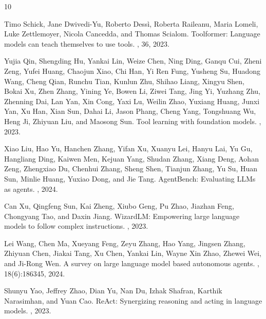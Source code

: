 \documentclass[sigconf,nonacm]{acmart}
\begin{document}

\begin{thebibliography}{10}

Timo Schick, Jane Dwivedi-Yu, Roberto Dessì, Roberta Raileanu, Maria Lomeli, Luke Zettlemoyer, Nicola Cancedda, and Thomas Scialom.
\newblock Toolformer: Language models can teach themselves to use tools.
, 36, 2023.

Yujia Qin, Shengding Hu, Yankai Lin, Weize Chen, Ning Ding, Ganqu Cui, Zheni Zeng, Yufei Huang, Chaojun Xiao, Chi Han, Yi Ren Fung, Yusheng Su, Huadong Wang, Cheng Qian, Runchu Tian, Kunlun Zhu, Shihao Liang, Xingyu Shen, Bokai Xu, Zhen Zhang, Yining Ye, Bowen Li, Ziwei Tang, Jing Yi, Yuzhang Zhu, Zhenning Dai, Lan Yan, Xin Cong, Yaxi Lu, Weilin Zhao, Yuxiang Huang, Junxi Yan, Xu Han, Xian Sun, Dahai Li, Jason Phang, Cheng Yang, Tongshuang Wu, Heng Ji, Zhiyuan Liu, and Maosong Sun.
\newblock Tool learning with foundation models.
, 2023.

Xiao Liu, Hao Yu, Hanchen Zhang, Yifan Xu, Xuanyu Lei, Hanyu Lai, Yu Gu, Hangliang Ding, Kaiwen Men, Kejuan Yang, Shudan Zhang, Xiang Deng, Aohan Zeng, Zhengxiao Du, Chenhui Zhang, Sheng Shen, Tianjun Zhang, Yu Su, Huan Sun, Minlie Huang, Yuxiao Dong, and Jie Tang.
\newblock AgentBench: Evaluating LLMs as agents.
, 2024.

Can Xu, Qingfeng Sun, Kai Zheng, Xiubo Geng, Pu Zhao, Jiazhan Feng, Chongyang Tao, and Daxin Jiang.
\newblock WizardLM: Empowering large language models to follow complex instructions.
, 2023.

Lei Wang, Chen Ma, Xueyang Feng, Zeyu Zhang, Hao Yang, Jingsen Zhang, Zhiyuan Chen, Jiakai Tang, Xu Chen, Yankai Lin, Wayne Xin Zhao, Zhewei Wei, and Ji-Rong Wen.
\newblock A survey on large language model based autonomous agents.
, 18(6):186345, 2024.

Shunyu Yao, Jeffrey Zhao, Dian Yu, Nan Du, Izhak Shafran, Karthik Narasimhan, and Yuan Cao.
\newblock ReAct: Synergizing reasoning and acting in language models.
, 2023.


\end{thebibliography}
\end{document}
